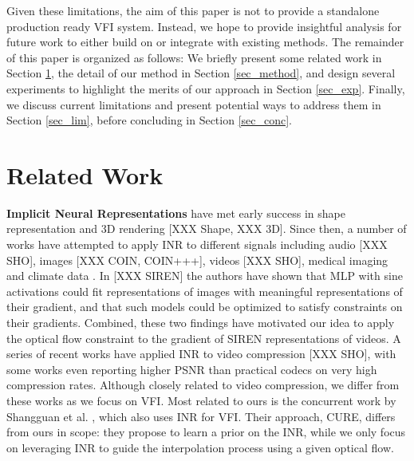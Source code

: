 \documentclass{article}
\begin{document}

Given these limitations, the aim of this paper is not to provide a standalone production ready VFI system.
Instead, we hope to provide insightful analysis for future work to either build on or integrate with existing methods.
The remainder of this paper is organized as follows:
We briefly present some related work in Section \ref{sec_related},
the detail of our method in Section \ref{sec_method},
and design several experiments to highlight the merits of our approach in Section \ref{sec_exp}.
Finally, we discuss current limitations and present potential ways to address them in Section \ref{sec_lim},
before concluding in Section \ref{sec_conc}.

\section{Related Work}
\label{sec_related}

\textbf{ Implicit Neural Representations} have met early success in
shape representation and 3D rendering [XXX Shape, XXX 3D].
Since then, a number of works have attempted to
apply INR to different signals including audio [XXX SHO], images [XXX COIN, COIN+++], videos [XXX SHO],
medical imaging and climate data \cite{dupont2022coin++}.
In [XXX SIREN] the authors have shown that MLP with sine activations
could fit representations of images with meaningful representations of their gradient,
and that such models could be optimized to satisfy constraints on their gradients.
Combined, these two findings have motivated our idea to apply the optical
flow constraint to the gradient of SIREN representations of videos.
A series of recent works have applied INR to video compression [XXX SHO],
with some works \cite{chen2021nerv} even reporting higher PSNR
than practical codecs on very high compression rates.
Although closely related to video compression,
we differ from these works as we focus on VFI.
Most related to ours is the concurrent work by Shangguan et al. \cite{shangguan2022learning}, which also uses INR for VFI.
Their approach, CURE, differs from ours in scope:
they propose to learn a prior on the INR,
while we only focus on leveraging INR to guide the interpolation process using a given optical flow.
\end{document}
